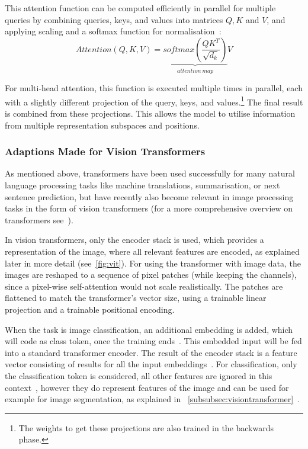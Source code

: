 This attention function can be computed efficiently in parallel for multiple queries by combining queries, keys, and values into matrices $Q, K$ and $V$, and applying scaling and a softmax function for normalisation~\autocite{Vaswani2017}:
\begin{equation}
    Attention(Q,K,V)=\underbrace{softmax\left(\frac{Q K^T}{\sqrt{d_k}}\right)}_{attention~map} V
    \label{eq:KQV}
\end{equation}

For multi-head attention, this function is executed multiple times in parallel, each with a slightly different projection of the query, keys, and values.\footnote{The weights to get these projections are also trained in the backwards phase.}
The final result is combined from these projections.
This allows the model to utilise information from multiple representation subspaces and positions.~\autocite{Vaswani2017}


\subsubsection{Adaptions Made for Vision Transformers}\label{subsubsec:visiontransformer}
As mentioned above, transformers have been used successfully for many natural language processing tasks like machine translations, summarisation, or next sentence prediction, but have recently also become relevant in image processing tasks in the form of vision transformers (for a more comprehensive overview on transformers see~\autocite{Lin2021}).

In vision transformers, only the encoder stack is used, which provides a representation of the image, where all relevant features are encoded, as explained later in more detail (see~\autoref{fig:vit}).
For using the transformer with image data, the images are reshaped to a sequence of pixel patches (while keeping the channels), since a pixel-wise self-attention would not scale realistically.
The patches are flattened to match the transformer's vector size, using a trainable linear projection and a trainable positional encoding.~\autocite{Dosovitskiy2021}

When the task is image classification, an additional embedding is added, which will code as class token, once the training ends~\autocite{Devlin2019}.
This embedded input will be fed into a standard transformer encoder.
The result of the encoder stack is a feature vector consisting of results for all the input embeddings~\autocite{Dosovitskiy2021}.
For classification, only the classification token is considered, all other features are ignored in this context~\autocite{Dosovitskiy2021}, however they do represent features of the image and can be used for example for image segmentation, as explained in ~\autoref{subsubsec:visiontransformer}~\autocite{Dosovitskiy2021, Caron2021}.

